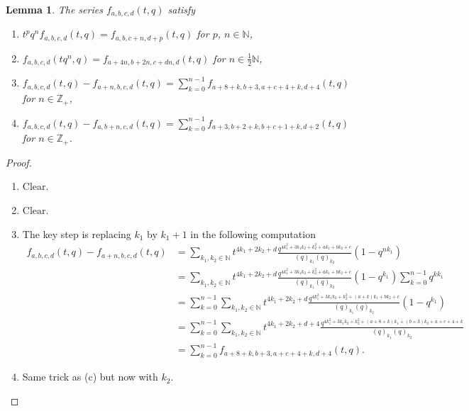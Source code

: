 \documentclass[12pt, a4paper]{article}
\newtheorem{lemma}{Lemma}
\begin{document}
\begin{lemma}
  \label{lmm:1}
  The series $f_{a, b, c, d}(t, q)$ satisfy
  \begin{enumerate}[label={(\alph*)}]
  \item $t^pq^nf_{a, b, c, d}(t, q) = f_{a, b, c + n, d + p}(t, q)$ for $p$, $n \in \mathbb{N}$,
  \item $f_{a, b, c, d}(tq^n, q) = f_{a + 4n, b + 2n, c + dn, d}(t, q)$ for $n \in \frac{1}{2}\mathbb{N}$,
  \item $f_{a, b, c, d}(t, q) - f_{a + n, b, c, d}(t, q) = \sum_{k = 0}^{n - 1}f_{a + 8 + k, b + 3, a + c + 4 + k, d + 4}(t, q)$ for $n \in \mathbb{Z}_+$,
  \item $f_{a, b, c, d}(t, q) - f_{a, b + n, c, d}(t, q) = \sum_{k = 0}^{n - 1}f_{a + 3, b + 2 + k, b + c + 1 + k, d + 2}(t, q)$ for $n \in \mathbb{Z}_+$.
  \end{enumerate}
\end{lemma}

\begin{proof}
  \begin{enumerate}[label=(\alph*)]
  \item Clear.
  \item Clear.
  \item The key step is replacing $k_1$ by $k_1 + 1$ in the following computation
    \begin{align*}
      f_{a, b, c, d}(t, q) - f_{a + n, b, c, d}(t, q) &= \sum_{k_1, k_2 \in \mathbb{N}}t^{4k_1 + 2k_2 + d}\frac{q^{4k_1^2 + 3k_1k_2 + k_2^2 + ak_1 + bk_2 + c}}{(q)_{k_1}(q)_{k_2}}(1 - q^{nk_1}) \\
      &= \sum_{k_1, k_2 \in \mathbb{N}}t^{4k_1 + 2k_2 + d}\frac{q^{4k_1^2 + 3k_1k_2 + k_2^2 + ak_1 + bk_2 + c}}{(q)_{k_1}(q)_{k_2}}(1 - q^{k_1})\sum_{k = 0}^{n - 1}q^{kk_1} \\
      &= \sum_{k = 0}^{n - 1}\sum_{k_1, k_2 \in \mathbb{N}}t^{4k_1 + 2k_2 + d}\frac{q^{4k_1^2 + 3k_1k_2 + k_2^2 + (a + k)k_1 + bk_2 + c}}{(q)_{k_1}(q)_{k_2}}(1 - q^{k_1}) \\
      &= \sum_{k = 0}^{n - 1}\sum_{k_1, k_2 \in \mathbb{N}}t^{4k_1 + 2k_2 + d + 4}\frac{q^{4k_1^2 + 3k_1k_2 + k_2^2 + (a + 8 + k)k_1 + (b + 3)k_2 + a + c + 4 + k}}{(q)_{k_1}(q)_{k_2}} \\
      &= \sum_{k = 0}^{n - 1}f_{a + 8 + k, b + 3, a + c + 4 + k, d + 4}(t, q).
    \end{align*}
  \item Same trick as (c) but now with $k_2$.
  \end{enumerate}
\end{proof}
\end{document}
